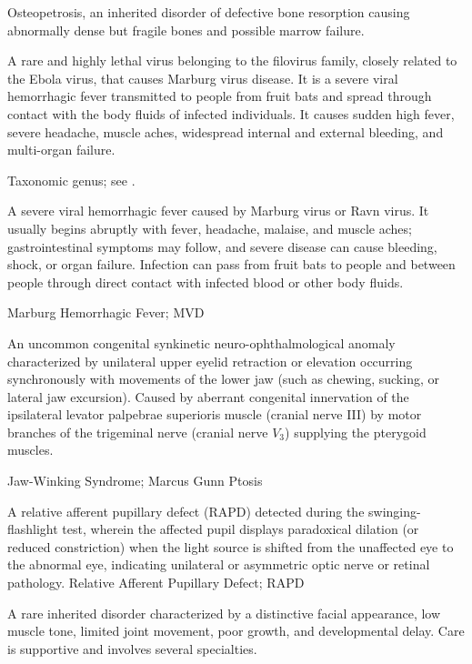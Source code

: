  Osteopetrosis, an inherited disorder of defective bone resorption causing abnormally dense but fragile bones and possible marrow failure.

 A rare and highly lethal virus belonging to the filovirus family, closely related to the Ebola virus, that causes Marburg virus disease. It is a severe viral hemorrhagic fever transmitted to people from fruit bats and spread through contact with the body fluids of infected individuals. It causes sudden high fever, severe headache, muscle aches, widespread internal and external bleeding, and multi-organ failure.

 Taxonomic genus; see .

 A severe viral hemorrhagic fever caused by
Marburg virus or Ravn virus. It usually begins abruptly with fever, headache,
malaise, and muscle aches; gastrointestinal symptoms may follow, and severe
disease can cause bleeding, shock, or organ failure. Infection can pass from
fruit bats to people and between people through direct contact with infected
blood or other body fluids.

\synonyms
Marburg Hemorrhagic Fever; MVD

 An uncommon congenital synkinetic neuro-ophthalmological anomaly characterized by unilateral upper eyelid retraction or elevation occurring synchronously with movements of the lower jaw (such as chewing, sucking, or lateral jaw excursion). Caused by aberrant congenital innervation of the ipsilateral levator palpebrae superioris muscle (cranial nerve III) by motor branches of the trigeminal nerve (cranial nerve $V_3$) supplying the pterygoid muscles.

\synonyms
Jaw-Winking Syndrome; Marcus Gunn Ptosis

 A relative afferent pupillary defect (RAPD) detected during the swinging-flashlight test, wherein the affected pupil displays paradoxical dilation (or reduced constriction) when the light source is shifted from the unaffected eye to the abnormal eye, indicating unilateral or asymmetric optic nerve or retinal pathology.
\synonyms
Relative Afferent Pupillary Defect; RAPD

 A rare inherited disorder characterized by a distinctive facial appearance, low muscle tone, limited joint movement, poor growth, and developmental delay. Care is supportive and involves several specialties.

